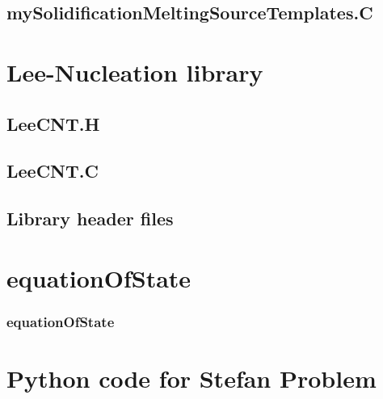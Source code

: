 \subsection{mySolidificationMeltingSourceTemplates.C}

\section{Lee-Nucleation library}
\label{Lee-Nucleation library}
\subsection{LeeCNT.H}

\subsection{LeeCNT.C}

\subsection{Library header files}



\section{equationOfState}
\label{equationOfState}
\subsubsection*{equationOfState}



\section{Python code for Stefan Problem}
\label{Python code for Stefan Problem}


\clearpage
